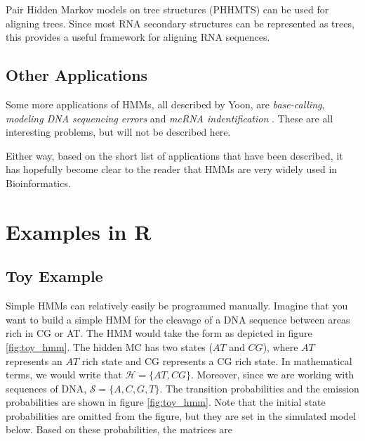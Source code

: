 \documentclass{article}\usepackage[]{graphicx}\usepackage[]{color}
\begin{document}
Pair Hidden Markov models on tree structures (PHHMTS) can be used for aligning trees. Since most RNA secondary structures can be represented as trees, this provides a useful framework for aligning RNA sequences. 

\subsection{Other Applications}
Some more applications of HMMs, all described by Yoon, are \textit{base-calling}, \textit{modeling DNA sequencing errors} and \textit{mcRNA indentification} \cite{Yoon2009}. These are all interesting problems, but will not be described here. 

Either way, based on the short list of applications that have been described, it has hopefully become clear to the reader that HMMs are very widely used in Bioinformatics. 

\section{Examples in R}

\subsection{Toy Example}

Simple HMMs can relatively easily be programmed manually. Imagine that you want to build a simple HMM for the cleavage of a DNA sequence between areas rich in CG or AT. The HMM would take the form as depicted in figure \ref{fig:toy_hmm}. The hidden MC has two states ($AT$ and $CG$), where $AT$ represents an $AT$ rich state and CG represents a CG rich state. In mathematical terms, we would write that $\mathcal{H} = \{AT, CG\}$. Moreover, since we are working with sequences of DNA, $\mathcal{S} = \{A,C,G,T\}$. The transition probabilities and the emission probabilities are shown in figure \ref{fig:toy_hmm}. Note that the initial state probabilities are omitted from the figure, but they are set in the simulated model below. Based on these probabilities, the matrices are
\end{document}
